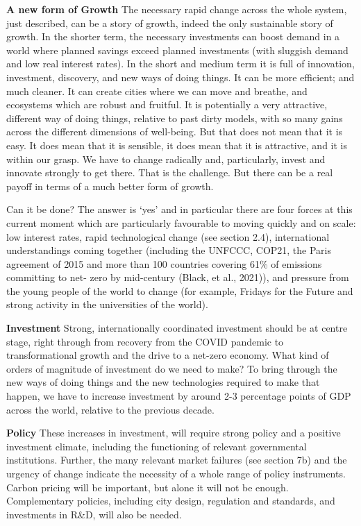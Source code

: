 \documentclass[
]{book}
\begin{document}
\textbf{A new form of Growth}
The necessary rapid change across the whole system, just described, can be a story of growth, indeed
the only sustainable story of growth. In the shorter term, the necessary investments can boost demand
in a world where planned savings exceed planned investments (with sluggish demand and low real
interest rates). In the short and medium term it is full of innovation, investment, discovery, and new
ways of doing things. It can be more efficient; and much cleaner. It can create cities where we can move
and breathe, and ecosystems which are robust and fruitful. It is potentially a very attractive, different
way of doing things, relative to past dirty models, with so many gains across the different dimensions
of well-being. But that does not mean that it is easy. It does mean that it is sensible, it does mean that
it is attractive, and it is within our grasp. We have to change radically and, particularly, invest and
innovate strongly to get there. That is the challenge. But there can be a real payoff in terms of a much
better form of growth.

Can it be done? The answer is `yes' and in particular there are four forces at this current moment which
are particularly favourable to moving quickly and on scale: low interest rates, rapid technological change
(see section 2.4), international understandings coming together (including the UNFCCC, COP21, the
Paris agreement of 2015 and more than 100 countries covering 61\% of emissions committing to net-
zero by mid-century (Black, et al., 2021)), and pressure from the young people of the world to change
(for example, Fridays for the Future and strong activity in the universities of the world).

\textbf{Investment}
Strong, internationally coordinated investment should be at centre stage,
right through from recovery from the COVID pandemic to transformational growth and
the drive to a net-zero economy.
What kind of orders of magnitude of investment do we need to make? To bring
through the new ways of doing things and the new technologies required to make
that happen, we have to increase investment by around 2-3 percentage points of GDP
across the world, relative to the previous decade.

\textbf{Policy}
These increases in investment, will require strong policy and a positive investment climate, including
the functioning of relevant governmental institutions. Further, the many relevant market failures (see
section 7b) and the urgency of change indicate the necessity of a whole range of policy instruments.
Carbon pricing will be important, but alone it will not be enough. Complementary policies, including city
design, regulation and standards, and investments in R\&D, will also be needed.
\end{document}
